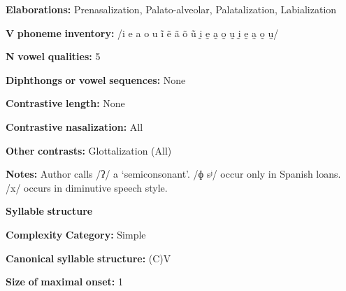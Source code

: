 \documentclass[output=paper]{langsci/langscibook}
\begin{document}
\begin{styleBody}
\textbf{Elaborations:} Prenasalization, Palato-alveolar, Palatalization, Labialization
\end{styleBody}

\begin{styleBody}
\textbf{V} \textbf{phoneme} \textbf{inventory:} /i e a o u ĩ ẽ ã õ ũ ḭ ḛ a̰ o̰ ṵ ḭ ḛ a̰ o̰ ṵ/
\end{styleBody}

\begin{styleBody}
\textbf{N} \textbf{vowel} \textbf{qualities:} 5
\end{styleBody}

\begin{styleBody}
\textbf{Diphthongs} \textbf{or} \textbf{vowel} \textbf{sequences:} None
\end{styleBody}

\begin{styleBody}
\textbf{Contrastive} \textbf{length:} None
\end{styleBody}

\begin{styleBody}
\textbf{Contrastive} \textbf{nasalization:} All
\end{styleBody}

\begin{styleBody}
\textbf{Other} \textbf{contrasts:} Glottalization (All)
\end{styleBody}

\begin{styleBody}
\textbf{Notes:} Author calls /ʔ/ a ‘semiconsonant’. /ɸ sʲ/ occur only in Spanish loans. /x/ occurs in diminutive speech style.
\end{styleBody}

\begin{styleBody}
\textbf{Syllable} \textbf{structure}
\end{styleBody}

\begin{styleBody}
\textbf{Complexity} \textbf{Category:} Simple
\end{styleBody}

\begin{styleBody}
\textbf{Canonical} \textbf{syllable} \textbf{structure:} (C)V \citep[14]{Bradley1970}
\end{styleBody}

\begin{styleBody}
\textbf{Size} \textbf{of} \textbf{maximal} \textbf{onset:} 1
\end{styleBody}
\end{document}
